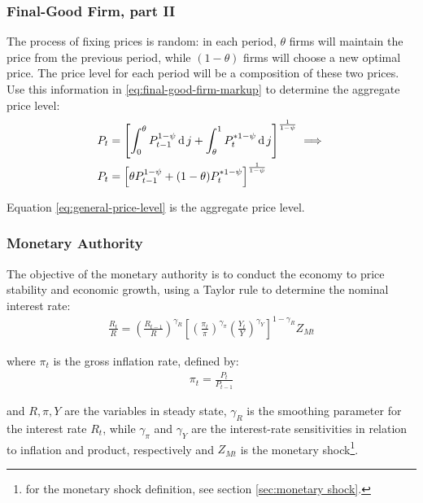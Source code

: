 \documentclass[
thesis.tex
]{subfiles}
\begin{document}
	\subsubsection{Final-Good Firm, part II}
	
	The process of fixing prices is random: in each period, $\theta$ firms will maintain the price from the previous period, while $(1-\theta)$ firms will choose a new optimal price. The price level for each period will be a composition of these two prices. Use this information in \ref{eq:final-good-firm-markup} to determine the aggregate price level:
	\begin{align}
		P_t & = \left[ \int_{0}^{\theta} P_{t-1}^{1-\psi} \operatorname{d} j + \int_{\theta}^{1} P_t^{\ast 1-\psi} \operatorname{d} j \right]^{\frac{1}{1-\psi}}  \implies \nonumber \\
		P_t & = \left[ \theta P_{t-1}^{1-\psi} + (1-\theta) P_t^{\ast 1-\psi} \right]^\frac{1}{1-\psi} \label{eq:general-price-level}
	\end{align}
	
	Equation \ref{eq:general-price-level} is the aggregate price level.
	
	
	\subsubsection{Monetary Authority}
	
	The objective of the monetary authority is to conduct the economy to price stability and economic growth, using a Taylor rule \cite{taylor_discretion_1993} to determine the nominal interest rate:
	\begin{align}
		\label{eq:monetary-policy}
		\frac{R_t}{R} =
		\left( \frac{R_{t-1}}{R} \right)^{\gamma_R}  \left[
		\left( \frac{\pi_t}{\pi} \right)^{\gamma_\pi}
		\left( \frac{Y_t}{Y} \right)^{\gamma_Y} \right]^{1-\gamma_R} Z_{Mt}
	\end{align}
	
	where $\pi_t$ is the gross inflation rate, defined by:
	\begin{align}
		\pi_t = \frac{P_t}{P_{t-1}}
		\label{eq:gross-inflation-rate}
	\end{align}
	
	and $R, \pi, Y$ are the variables in steady state, $\gamma_R$ is the smoothing parameter for the interest rate $R_t$, while $\gamma_\pi$ and $\gamma_Y$ are the interest-rate sensitivities in relation to inflation and product, respectively and $Z_{Mt}$ is the monetary shock\footnote{for the monetary shock definition, see section \ref{sec:monetary shock}.}.
	
\end{document}
